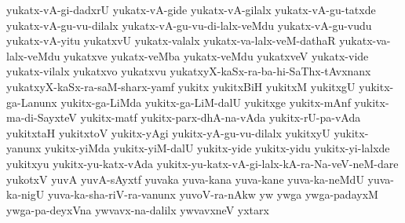 {yukatx-vA-gi-dadxrU
yukatx-vA-gide
yukatx-vA-gilalx
yukatx-vA-gu-tatxde
yukatx-vA-gu-vu-dilalx
yukatx-vA-gu-vu-di-lalx-veMdu
yukatx-vA-gu-vudu
yukatx-vA-yitu
yukatxvU
yukatx-valalx
yukatx-va-lalx-veM-dathaR
yukatx-va-lalx-veMdu
yukatxve
yukatx-veMba
yukatx-veMdu
yukatxveV
yukatx-vide
yukatx-vilalx
yukatxvo
yukatxvu
yukatxyX-kaSx-ra-ba-hi-SaThx-tAvxnanx
yukatxyX-kaSx-ra-saM-sharx-yamf
yukitx
yukitxBiH
yukitxM
yukitxgU
yukitx-ga-Lanunx
yukitx-ga-LiMda
yukitx-ga-LiM-dalU
yukitxge
yukitx-mAnf
yukitx-ma-di-SayxteV
yukitx-matf
yukitx-parx-dhA-na-vAda
yukitx-rU-pa-vAda
yukitxtaH
yukitxtoV
yukitx-yAgi
yukitx-yA-gu-vu-dilalx
yukitxyU
yukitx-yanunx
yukitx-yiMda
yukitx-yiM-dalU
yukitx-yide
yukitx-yidu
yukitx-yi-lalxde
yukitxyu
yukitx-yu-katx-vAda
yukitx-yu-katx-vA-gi-lalx-kA-ra-Na-veV-neM-dare
yukotxV
yuvA
yuvA-sAyxtf
yuvaka
yuva-kana
yuva-kane
yuva-ka-neMdU
yuva-ka-nigU
yuva-ka-sha-riV-ra-vanunx
yuvoV-ra-nAkw
yw
ywga
ywga-padayxM
ywga-pa-deyxVna
ywvavx-na-dalilx
ywvavxneV
yxtarx
}
